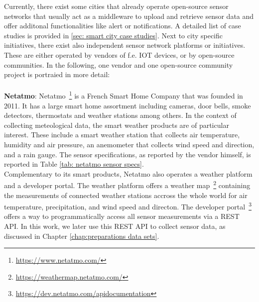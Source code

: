 Currently, there exist some cities that already operate open-source sensor networks that usually act as a middleware to upload and retrieve sensor data and offer additonal functionalities like alert or notifications. A detailed list of case studies is provided in \ref{sec: smart city case studies}. Next to city specific initiatives, there exist also independent sensor network platforms or initiatives. These are either operated by vendors of f.e. IOT devices, or by open-source communities. In the following, one vendor and one open-source community project is portraied in more detail:\\
\\
\textbf{Netatmo}: Netatmo~\footnote{\url{https://www.netatmo.com/}} is a French Smart Home Company that was founded in 2011. It has a large smart home assortment including cameras, door bells, smoke detectors, thermostats and weather stations among others. In the context of collecting meteological data, the smart weather products are of particular interest. These include a smart weather station that collects air temperature, humidity and air pressure, an anemometer that collects wind speed and direction, and a rain gauge. The sensor specifications, as reported by the vendor himself, is reported in Table \ref{tab: netatmo sensor specs}.\\
Complementary to its smart products, Netatmo also operates a weather platform and a developer portal. The weather platform offers a weather map~\footnote{\url{https://weathermap.netatmo.com/}} containing the measurements of connected weather stations accross the whole world for air temperature, precipitation, and wind speed and directon. The developer portal~\footnote{\url{https://dev.netatmo.com/apidocumentation}} offers a way to programmatically access all sensor measurements via a REST API. In this work, we later use this REST API to collect sensor data, as discussed in Chapter \ref{chap:preparations data sets}.


